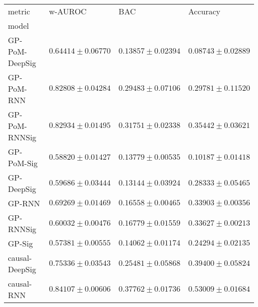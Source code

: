 \begin{tabular}{llll}
\toprule
metric &                                           w-AUROC &                                               BAC &                                          Accuracy \\
model          &                                                   &                                                   &                                                   \\
\midrule
GP-PoM-DeepSig &                           $ 0.64414 \pm 0.06770 $ &                           $ 0.13857 \pm 0.02394 $ &                           $ 0.08743 \pm 0.02889 $ \\
GP-PoM-RNN     &                           $ 0.82808 \pm 0.04284 $ &                           $ 0.29483 \pm 0.07106 $ &                           $ 0.29781 \pm 0.11520 $ \\
GP-PoM-RNNSig  &                           $ 0.82934 \pm 0.01495 $ &                           $ 0.31751 \pm 0.02338 $ &                           $ 0.35442 \pm 0.03621 $ \\
GP-PoM-Sig     &                           $ 0.58820 \pm 0.01427 $ &                           $ 0.13779 \pm 0.00535 $ &                           $ 0.10187 \pm 0.01418 $ \\
GP-DeepSig     &                           $ 0.59686 \pm 0.03444 $ &                           $ 0.13144 \pm 0.03924 $ &                           $ 0.28333 \pm 0.05465 $ \\
GP-RNN         &                           $ 0.69269 \pm 0.01469 $ &                           $ 0.16558 \pm 0.00465 $ &                           $ 0.33903 \pm 0.00356 $ \\
GP-RNNSig      &                           $ 0.60032 \pm 0.00476 $ &                           $ 0.16779 \pm 0.01559 $ &                           $ 0.33627 \pm 0.00213 $ \\
GP-Sig         &                           $ 0.57381 \pm 0.00555 $ &                           $ 0.14062 \pm 0.01174 $ &                           $ 0.24294 \pm 0.02135 $ \\
causal-DeepSig &                           $ 0.75336 \pm 0.03543 $ &                           $ 0.25481 \pm 0.05868 $ &                           $ 0.39400 \pm 0.05824 $ \\
causal-RNN     &                           $ 0.84107 \pm 0.00606 $ &                           $ 0.37762 \pm 0.01736 $ &                           $ 0.53009 \pm 0.01684 $ \\

\end{tabular}
